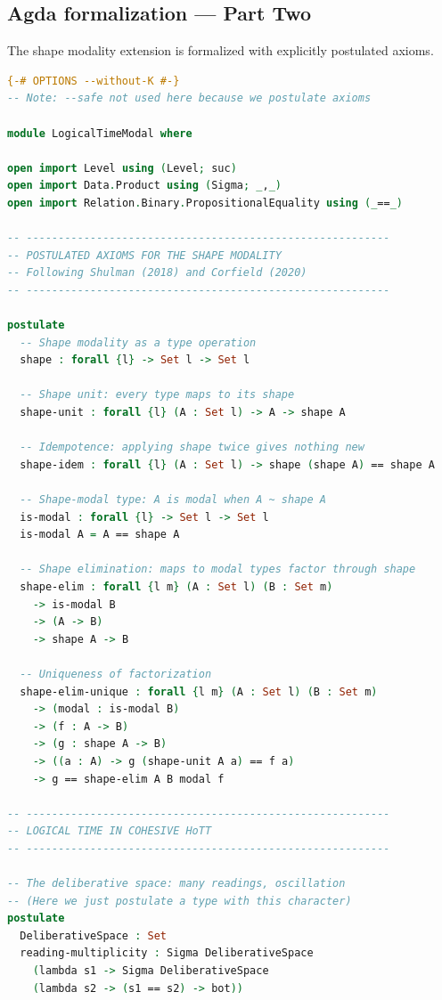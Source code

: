 \documentclass[12pt]{article}
\theoremstyle{definition}
\theoremstyle{remark}
\begin{document}
\subsection{Agda formalization --- Part Two}

The shape modality extension is formalized with explicitly postulated axioms.

\begin{lstlisting}[language=Agda, caption={Shape modality formalization (conditional on postulates)}]
{-# OPTIONS --without-K #-}
-- Note: --safe not used here because we postulate axioms

module LogicalTimeModal where

open import Level using (Level; suc)
open import Data.Product using (Sigma; _,_)
open import Relation.Binary.PropositionalEquality using (_==_)

-- ---------------------------------------------------------
-- POSTULATED AXIOMS FOR THE SHAPE MODALITY
-- Following Shulman (2018) and Corfield (2020)
-- ---------------------------------------------------------

postulate
  -- Shape modality as a type operation
  shape : forall {l} -> Set l -> Set l

  -- Shape unit: every type maps to its shape
  shape-unit : forall {l} (A : Set l) -> A -> shape A

  -- Idempotence: applying shape twice gives nothing new
  shape-idem : forall {l} (A : Set l) -> shape (shape A) == shape A

  -- Shape-modal type: A is modal when A ~ shape A
  is-modal : forall {l} -> Set l -> Set l
  is-modal A = A == shape A

  -- Shape elimination: maps to modal types factor through shape
  shape-elim : forall {l m} (A : Set l) (B : Set m)
    -> is-modal B
    -> (A -> B)
    -> shape A -> B

  -- Uniqueness of factorization
  shape-elim-unique : forall {l m} (A : Set l) (B : Set m)
    -> (modal : is-modal B)
    -> (f : A -> B)
    -> (g : shape A -> B)
    -> ((a : A) -> g (shape-unit A a) == f a)
    -> g == shape-elim A B modal f

-- ---------------------------------------------------------
-- LOGICAL TIME IN COHESIVE HoTT
-- ---------------------------------------------------------

-- The deliberative space: many readings, oscillation
-- (Here we just postulate a type with this character)
postulate
  DeliberativeSpace : Set
  reading-multiplicity : Sigma DeliberativeSpace
    (lambda s1 -> Sigma DeliberativeSpace
    (lambda s2 -> (s1 == s2) -> bot))


\end{lstlisting}
\end{document}
